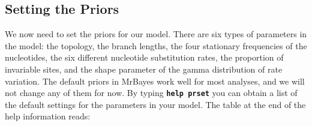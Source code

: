 \documentclass[12pt]{book}
\newcommand{\ttt}[1]{\texttt{#1}}
\newcommand{\tb}[1]{\ttt{\textbf{#1}}}
\begin{document}
\subsection{Setting the Priors}

We now need to set the priors for our model. There are six types of parameters in the model: the
topology, the branch lengths, the four stationary frequencies of the nucleotides, the six different
nucleotide substitution rates, the proportion of invariable sites, and the shape parameter of the
gamma distribution of rate variation. The default priors in MrBayes work well for most analyses,
and we will not change any of them for now. By typing \tb{help prset} you can obtain a list of the
default settings for the parameters in your model. The table at the end of the help information
reads:
\end{document}
